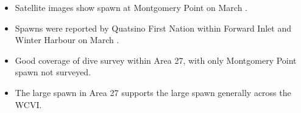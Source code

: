 \begin{itemize}

\item Satellite images show spawn at Montgomery Point on March .

\item Spawns were reported by Quatsino First Nation
within Forward Inlet and Winter Harbour on March .

\item Good coverage of dive survey within Area 27,
with only Montgomery Point spawn not surveyed.

\item The large spawn in Area 27
supports the large spawn generally across the WCVI.

\end{itemize}